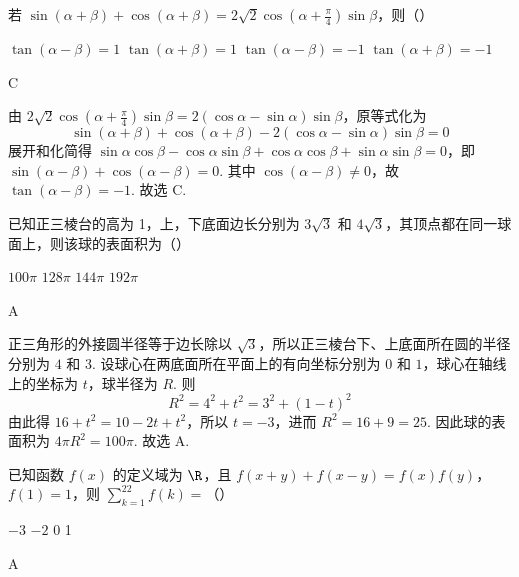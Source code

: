 \begin{problem}
若 \(\sin(\alpha+\beta)+\cos(\alpha+\beta)=2\sqrt2\cos\left(\alpha+\frac{\pi}{4}\right)\sin\beta\)，则（\quad）

\choices
    {\(\tan(\alpha-\beta)=1\)}
    {\(\tan(\alpha+\beta)=1\)}
    {\(\tan(\alpha-\beta)=-1\)}
    {\(\tan(\alpha+\beta)=-1\)}
\end{problem}

\begin{answer}
C
\end{answer}

\begin{solution}
由
\(2\sqrt2\cos\left(\alpha+\frac\pi4\right)\sin\beta=2(\cos\alpha-\sin\alpha)\sin\beta\)，原等式化为
\[
\sin(\alpha+\beta)+\cos(\alpha+\beta)-2(\cos\alpha-\sin\alpha)\sin\beta=0
\]
展开和化简得
\(\sin\alpha\cos\beta-\cos\alpha\sin\beta+\cos\alpha\cos\beta+\sin\alpha\sin\beta=0\)，即
\(\sin(\alpha-\beta)+\cos(\alpha-\beta)=0\).
其中 \(\cos(\alpha-\beta)\ne0\)，故 \(\tan(\alpha-\beta)=-1\).
故选 C.
\end{solution}


\begin{problem}
已知正三棱台的高为 1，上，下底面边长分别为 \(3\sqrt3\) 和 \(4\sqrt3\)，其顶点都在同一球面上，则该球的表面积为（\quad）

\choices
    {\(100\pi\)}
    {\(128\pi\)}
    {\(144\pi\)}
    {\(192\pi\)}
\end{problem}

\begin{answer}
A
\end{answer}

\begin{solution}
正三角形的外接圆半径等于边长除以 \(\sqrt3\)，所以正三棱台下、上底面所在圆的半径分别为 \(4\) 和 \(3\). 设球心在两底面所在平面上的有向坐标分别为 \(0\) 和 \(1\)，球心在轴线上的坐标为 \(t\)，球半径为 \(R\). 则
\[
R^2=4^2+t^2=3^2+(1-t)^2
\]
由此得 \(16+t^2=10-2t+t^2\)，所以 \(t=-3\)，进而 \(R^2=16+9=25\). 因此球的表面积为
\(4\pi R^2=100\pi\).
故选 A.
\end{solution}


\begin{problem}
已知函数 \(f(x)\) 的定义域为 \(\R\)，且 \(f(x+y)+f(x-y)=f(x)f(y)\)，\(f(1)=1\)，则 \(\sum_{k=1}^{22}f(k)=\)（\quad）

\choices
    {\(-3\)}
    {\(-2\)}
    {0}
    {1}
\end{problem}

\begin{answer}
A
\end{answer}

